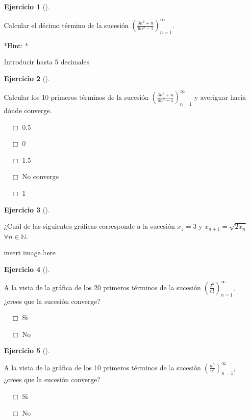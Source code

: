 \documentclass[
  a4paper,
]{scrreport}
\theoremstyle{definition}
\newtheorem{exercise}{Ejercicio}[chapter]
\theoremstyle{remark}
\begin{document}
\leavevmode{}%
\begin{exercise}[]\label{exr-sucesiones-propuesto-1}

Calcular el décimo término de la sucesión
\(\left(\frac{3n^2+n}{6n^2-1}\right)_{n=1}^\infty\).

\vspace{18pt}*Hint: *

Introducir hasta 5 decimales

\end{exercise}

\leavevmode{}%
\begin{exercise}[]\label{exr-sucesiones-propuesto-2}

Calcular los 10 primeros términos de la sucesión
\(\left(\frac{3n^2+n}{6n^2-1}\right)_{n=1}^\infty\) y averiguar hacia
dónde converge.

${\quad\Box}$ 0.5

${\quad\Box}$ 0

${\quad\Box}$ 1.5

${\quad\Box}$ No converge

${\quad\Box}$ 1

\end{exercise}

\leavevmode{}%
\begin{exercise}[]\label{exr-sucesiones-propuesto-3}

¿Cuál de las siguientes gráficas corresponde a la sucesión \(x_1=3\) y
\(x_{n+1}=\sqrt{2x_n}\) \(\forall n\in\mathbb{N}\).

insert image here

\end{exercise}

\leavevmode{}%
\begin{exercise}[]\label{exr-sucesiones-propuesto-4}

A la vista de la gráfica de los 20 primeros términos de la sucesión
\(\left(\frac{2^n}{n!}\right)_{n=1}^\infty\), ¿crees que la sucesión
converge?

${\quad\Box}$ Si

${\quad\Box}$ No

\end{exercise}

\leavevmode{}%
\begin{exercise}[]\label{exr-sucesiones-propuesto-5}

A la vista de la gráfica de los 10 primeros términos de la sucesión
\(\left(\frac{n^n}{n!}\right)_{n=1}^\infty\), ¿crees que la sucesión
converge?

${\quad\Box}$ Si

${\quad\Box}$ No

\end{exercise}
\end{document}
